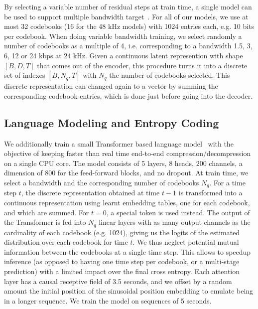 By selecting a variable number of residual steps at train time, a single model can be used to support multiple bandwidth target~\citep{zeghidour2021soundstream}. For all of our models, we use at most 32 codebooks (16 for the 48 kHz models) with 1024 entries each, e.g. 10 bits per codebook. When doing variable bandwidth training, we select randomly a number of codebooks as a multiple of 4, i.e. corresponding to a bandwidth 1.5, 3, 6, 12 or 24 kbps at 24 kHz. Given a continuous latent represention with shape $[B, D, T]$ that comes out of the encoder, this procedure turns it into a discrete set of indexes $[B, N_q, T]$ with $N_q$ the number of codebooks selected. 
This discrete representation can changed again
to a vector by summing the corresponding codebook entries, which is done just before going into the decoder.

\subsection{Language Modeling and Entropy Coding}
\label{sec:lm}

We additionally train a small Transformer based language model~\citep{vaswani2017attention} 
with the objective of 
keeping faster than real time end-to-end compression/decompression on a single CPU core. The model consists
of 5 layers, 8 heads, 200 channels, a dimension of 800 for the feed-forward blocks, and no dropout.
At train time, we select a bandwidth and the corresponding number of codebooks $N_q$. 
For a time step $t$, the discrete representation obtained at time $t - 1$ is transformed into a continuous
representation using learnt embedding tables, one for each codebook, and which are summed.
For $t=0$, a special token is used instead.
The output of the Transformer is fed into $N_q$ linear layers with as many output channels as the cardinality of each codebook (e.g. 1024), giving us the logits of the estimated distribution over each codebook for time $t$.
 We thus neglect potential mutual information between the codebooks at a single time step. This allows to speedup inference (as opposed to having one time step per codebook, or a multi-stage prediction) with a limited
impact over the final cross entropy. Each attention layer has a causal receptive field of 3.5 seconds, and we offset by a random amount the initial position of the sinusoidal position embedding to emulate being in a longer sequence. We train the model on sequences of 5 seconds.

